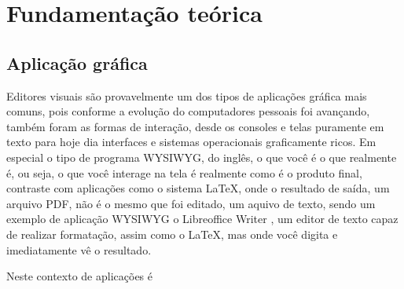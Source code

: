 \chapter{Fundamentação teórica}

\section{Aplicação gráfica}

Editores visuais são provavelmente um dos tipos de aplicações gráfica mais comuns, pois conforme a evolução do computadores pessoais foi avançando, também foram as formas de interação, desde os consoles e telas puramente em texto para hoje dia interfaces e sistemas operacionais graficamente ricos. Em especial o tipo de programa WYSIWYG, do inglês, o que você é o que realmente é, ou seja, o que você interage na tela é realmente como é o produto final, contraste com aplicações como o sistema \LaTeX \cite{latex}, onde o resultado de saída, um arquivo PDF, não é o mesmo que foi editado, um aquivo de texto, sendo um exemplo de aplicação WYSIWYG o Libreoffice Writer \cite{writer}, um editor de texto capaz de realizar formatação, assim como o \LaTeX, mas onde você digita e imediatamente vê o resultado.

Neste contexto de aplicações é 
